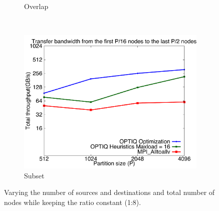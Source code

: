 \begin{figure}[!htbp]
\begin{subfigure}[b]{0.32\textwidth}
                \caption{Overlap}
                \label{fig:constantr_27}
        \end{subfigure}
        ~ %
        \begin{subfigure}[b]{0.32\textwidth}
                \includegraphics[width=\textwidth]{figures/constantr_87}
                \caption{Subset}
                \label{fig:constantr_87}
        \end{subfigure}
        \caption{\small Varying the number of sources and destinations and total number of nodes while keeping the ratio constant (1:8).}
	\vspace{-0.15in}
        \label{fig:constantr}
\end{figure}

